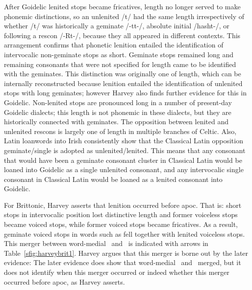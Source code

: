 After Goidelic lenited stops became fricatives, length no longer served to make phonemic distinctions, so an unlenited /t/ had the same length irrespectively of whether /t/ was historically a geminate /-tt-/, absolute initial /\gls{hash}t-/, or following a \gls{rescon} /-\gls{R}t-/, because they all appeared in different contexts. This arrangement confirms that phonetic lenition entailed the identification of intervocalic non-geminate stops as short. Geminate stops remained long and remaining consonants that were not specified for length came to be identified with the geminates. This distinction was originally one of length, which can be internally reconstructed because lenition entailed the identification of unlenited stops with long geminates; however Harvey also finds further evidence for this in Goidelic. Non-lenited stops are pronounced long in a number of present-day Goidelic dialects; this length is not phonemic in these dialects, but they are historically connected with geminates. The opposition between lenited and unlenited \gls{rescon}s is largely one of length in multiple branches of Celtic. Also, Latin loanwords into Irish consistently show that the Classical Latin opposition geminate/single is adopted as unlenited/lenited. This means that any consonant that would have been a geminate consonant cluster in Classical Latin would be loaned into Goidelic as a single unlenited consonant, and any intervocalic single consonant in Classical Latin would be loaned as a lenited consonant into Goidelic.

For Brittonic, Harvey asserts that  lenition  occurred before \gls{apoc}. That is: short stops in intervocalic position lost distinctive length and former voiceless stops became voiced stops, while former voiced stops became fricatives. As a result, geminate voiced stops in words such as  fell together with lenited voiceless stops. This merger between word-medial \xD\ and \lT\ is indicated with arrows in Table~\ref{sfig:harveybrit1}. Harvey argues that this merger is borne out by the later evidence:
The later evidence does show that word-medial \xD\ and \lT\ merged, but it does not identify when this merger occurred or indeed whether this merger occurred before \gls{apoc}, as Harvey asserts. 

